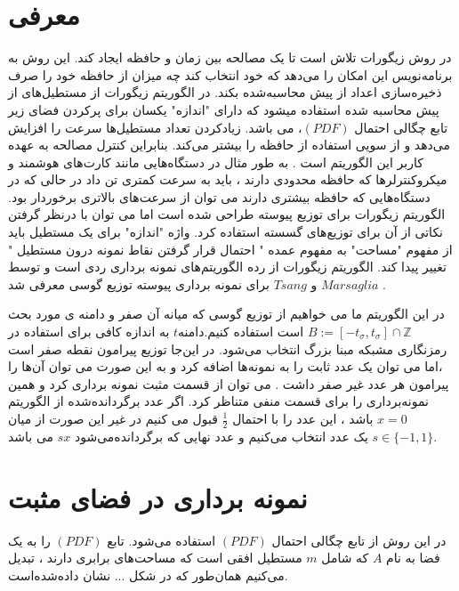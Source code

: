\section{معرفی}

در روش زیگورات تلاش است تا یک مصالحه بین زمان و حافظه ایجاد کند. این روش به برنامه‌نویس این امکان را می‌دهد که خود انتخاب کند چه میزان از حافظه خود را صرف ذخیره‌سازی اعداد از پیش محاسبه‌شده بکند. 
در الگوریتم زیگورات از مستطیل‌های از پیش محاسبه شده استفاده میشود که دارای "اندازه" یکسان برای پرکردن فضای زیر تابع چگالی احتمال $(PDF)$، می باشد. زیادکردن تعداد مستطیل‌ها سرعت را افزایش می‌دهد و از سویی استفاده از حافظه را بیشتر می‌کند. بنابراین کنترل مصالحه به عهده کاربر این الگوریتم است . به طور مثال در دستگاه‌هایی مانند کارت‌های هوشمند و میکروکنترلرها که حافظه محدودی دارند ، باید به سرعت کمتری تن داد در حالی که در دستگاه‌هایی که حافظه بیشتری دارند می توان از سرعت‌های بالاتری برخوردار بود. الگوریتم زیگورات برای توزیع پیوسته طراحی شده است اما می توان با درنظر گرفتن نکاتی از آن برای توزیع‌های گسسته استفاده کرد. واژه "اندازه" برای یک مستطیل  باید از مفهوم "مساحت" به مفهوم عمده " احتمال قرار گرفتن نقاط نمونه درون مستطیل " تغییر پیدا کند. 
الگوریتم زیگورات از رده الگوریتم‌های نمونه برداری ردی است و توسط $Marsaglia$  و $Tsang$  برای نمونه برداری پیوسته توزیع گوسی معرفی شد . 
  
در این الگوریتم ما می خواهیم از توزیع گوسی که میانه آن صفر و دامنه ی مورد بحث $B :=[-t_{\sigma}, t_{\sigma}]\cap \mathbb{Z}$   است استفاده کنیم.دامنه$t$ به اندازه کافی  برای  استفاده در رمزنگاری مشبکه مبنا بزرگ انتخاب می‌شود. در این‌جا توزیع پیرامون نقطه صفر است ،اما می توان یک عدد ثابت را به نمونه‌ها اضافه کرد و به این صورت می توان آن‌ها را پیرامون هر عدد غیر صفر داشت .
می توان از قسمت مثبت نمونه برداری کرد و همین نمونه‌برداری را برای قسمت منفی متناظر کرد. اگر عدد برگردانده‌شده از الگوریتم $x = 0$ باشد ، این عدد را با احتمال $\frac{1}{2}$ قبول می کنیم در غیر این صورت از میان $s\in \lbrace -1, 1\rbrace $ یک عدد انتخاب می‌کنیم و عدد نهایی که برگردانده‌می‌شود $sx$ می باشد.
\section{نمونه برداری در فضای مثبت }

در این روش از تابع چگالی احتمال $(PDF)$ استفاده می‌شود.  تابع $(PDF)$ را به یک فضا به نام $A$  که شامل $m$ مستطیل افقی است که مساحت‌های برابری دارند  ، تبدیل می‌کنیم همان‌طور که در شکل ... نشان داده‌شده‌است.

